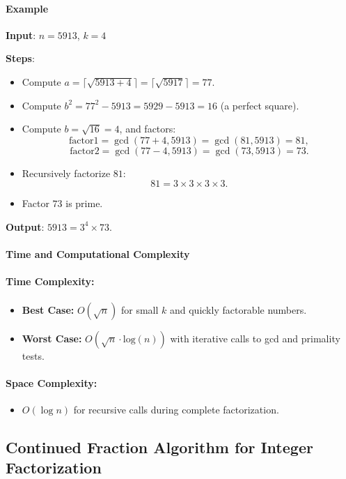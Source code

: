\documentclass[12pt]{report}
\begin{document}
\paragraph{Example}

\textbf{Input}: $n = 5913$, $k = 4$

\textbf{Steps}:
\begin{itemize}
    \item Compute $a = \lceil \sqrt{5913 + 4} \rceil = \lceil \sqrt{5917} \rceil = 77$.
    \item Compute $b^2 = 77^2 - 5913 = 5929 - 5913 = 16$ (a perfect square).
    \item Compute $b = \sqrt{16} = 4$, and factors:
\[
    \text{factor1} = \gcd(77 + 4, 5913) = \gcd(81, 5913) = 81,
\]
\[
    \text{factor2} = \gcd(77 - 4, 5913) = \gcd(73, 5913) = 73.
\]
    \item Recursively factorize $81$:
\[
    81 = 3 \times 3 \times 3 \times 3.
\]
    \item Factor $73$ is prime.
\end{itemize}

\textbf{Output}: $5913 = 3^4 \times 73$.

\paragraph{Time and Computational Complexity}

\paragraph{Time Complexity:}
\begin{itemize}
    \item \textbf{Best Case:} $O(\sqrt{n})$ for small $k$ and quickly factorable numbers.
    \item \textbf{Worst Case:} $O(\sqrt{n} \cdot \text{log}(n))$ with iterative calls to gcd and primality tests.
\end{itemize}

\paragraph{Space Complexity:}
\begin{itemize}
    \item $O(\log n)$ for recursive calls during complete factorization.
\end{itemize}


\subsection{Continued Fraction Algorithm for Integer Factorization}
\end{document}
